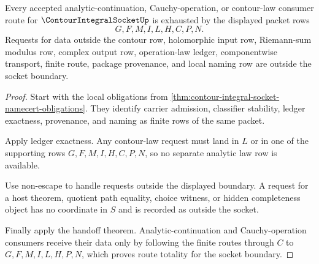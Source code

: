 \begin{theorem}
\label{thm:contour-integral-socket-boundary-route-totality}
Every accepted analytic-continuation, Cauchy-operation, or contour-law consumer route for $\ContourIntegralSocketUp$ is exhausted by the displayed packet rows
$$
G,F,M,I,L,H,C,P,N.
$$
Requests for data outside the contour row, holomorphic input row, Riemann-sum modulus row, complex output row, operation-law ledger, componentwise transport, finite route, package provenance, and local naming row are outside the socket boundary.
\end{theorem}
\begin{proof}
Start with the local obligations from \autoref{thm:contour-integral-socket-namecert-obligations}. They identify carrier admission, classifier stability, ledger exactness, provenance, and naming as finite rows of the same packet.

Apply ledger exactness. Any contour-law request must land in $L$ or in one of the supporting rows $G,F,M,I,H,C,P,N$, so no separate analytic law row is available.

Use non-escape to handle requests outside the displayed boundary. A request for a host theorem, quotient path equality, choice witness, or hidden completeness object has no coordinate in $S$ and is recorded as outside the socket.

Finally apply the handoff theorem. Analytic-continuation and Cauchy-operation consumers receive their data only by following the finite routes through $C$ to $G,F,M,I,L,H,P,N$, which proves route totality for the socket boundary.
\end{proof}


